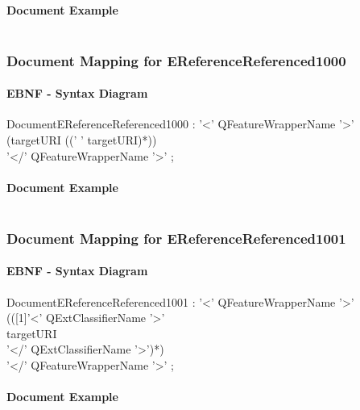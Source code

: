 \documentclass[11pt,a4paper]{article}
\begin{document}
\paragraph{Document Example}
\inputminted[fontsize=\footnotesize]{xml}{examples/EReferenceReferenced0111.xml}


\subsubsection{Document Mapping for EReferenceReferenced1000}
\paragraph{EBNF - Syntax Diagram}
\begin{rail}
DocumentEReferenceReferenced1000 : '<' QFeatureWrapperName '>' \\
(targetURI ((' ' targetURI)*)) \\
'</' QFeatureWrapperName '>' ;
\end{rail}

\paragraph{Document Example}
\inputminted[fontsize=\footnotesize]{xml}{examples/EReferenceReferenced1000.xml}


\subsubsection{Document Mapping for EReferenceReferenced1001}
\paragraph{EBNF - Syntax Diagram}
\begin{rail}
DocumentEReferenceReferenced1001 : '<' QFeatureWrapperName '>' \\
(([1]'<' QExtClassifierName  '>' \\ 
targetURI \\ 
'</' QExtClassifierName  '>')*) \\
'</' QFeatureWrapperName '>' ;
\end{rail}

\paragraph{Document Example}
\inputminted[fontsize=\footnotesize]{xml}{examples/EReferenceReferenced1001.xml}
\end{document}
